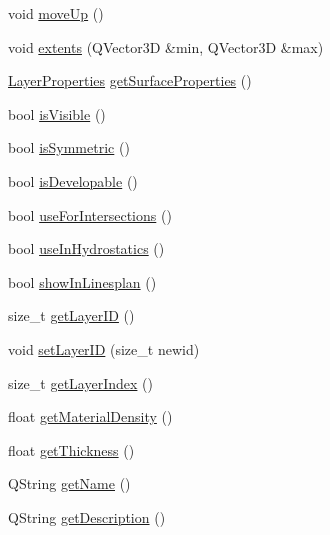 \begin{DoxyCompactItemize}
\item 
void \hyperlink{classShipCADGeometry_1_1SubdivisionLayer_aa5fc01f512f9d01f49e05c1608433654}{move\-Up} ()
\item 
void \hyperlink{classShipCADGeometry_1_1SubdivisionLayer_a2fc3ac326021a97479b821331e295640}{extents} (Q\-Vector3\-D \&min, Q\-Vector3\-D \&max)
\item 
\hyperlink{structShipCADGeometry_1_1LayerProperties}{Layer\-Properties} \hyperlink{classShipCADGeometry_1_1SubdivisionLayer_a7d42f81a94b46f0d999a4fa7a48d57d6}{get\-Surface\-Properties} ()
\item 
bool \hyperlink{classShipCADGeometry_1_1SubdivisionLayer_a6abf8365e77b1ebefbd5d03228efb2b5}{is\-Visible} ()
\item 
bool \hyperlink{classShipCADGeometry_1_1SubdivisionLayer_a48dfa484b555a964db080737cf2c5c0f}{is\-Symmetric} ()
\item 
bool \hyperlink{classShipCADGeometry_1_1SubdivisionLayer_a90a02f5cf0f49f47784e2f52a5283bbd}{is\-Developable} ()
\item 
bool \hyperlink{classShipCADGeometry_1_1SubdivisionLayer_a53e1ee753b64b7f08161e81901d6a7dd}{use\-For\-Intersections} ()
\item 
bool \hyperlink{classShipCADGeometry_1_1SubdivisionLayer_a3bf57aec73dfebdde5a6fb0a7596e2fb}{use\-In\-Hydrostatics} ()
\item 
bool \hyperlink{classShipCADGeometry_1_1SubdivisionLayer_affa6fc5b3ebb056b3e081372623c94c8}{show\-In\-Linesplan} ()
\item 
size\-\_\-t \hyperlink{classShipCADGeometry_1_1SubdivisionLayer_a422af89a2c4e8cdafd264fd54390ea85}{get\-Layer\-I\-D} ()
\item 
void \hyperlink{classShipCADGeometry_1_1SubdivisionLayer_afc09ab43011444cbb373114b7387b880}{set\-Layer\-I\-D} (size\-\_\-t newid)
\item 
size\-\_\-t \hyperlink{classShipCADGeometry_1_1SubdivisionLayer_a9a760dcc67779d111d5e05585e939138}{get\-Layer\-Index} ()
\item 
float \hyperlink{classShipCADGeometry_1_1SubdivisionLayer_aa7c79dd53c5c8c0a6ba3e0e8239013bc}{get\-Material\-Density} ()
\item 
float \hyperlink{classShipCADGeometry_1_1SubdivisionLayer_a824c050d58ae144e1f669ef84ed921be}{get\-Thickness} ()
\item 
Q\-String \hyperlink{classShipCADGeometry_1_1SubdivisionLayer_affb4df074a7f116ce60f51ad7b7ba230}{get\-Name} ()
\item 
Q\-String \hyperlink{classShipCADGeometry_1_1SubdivisionLayer_a0d4f8e0f8f99b18fc6bf5df0554d11ce}{get\-Description} ()

\end{DoxyCompactItemize}
